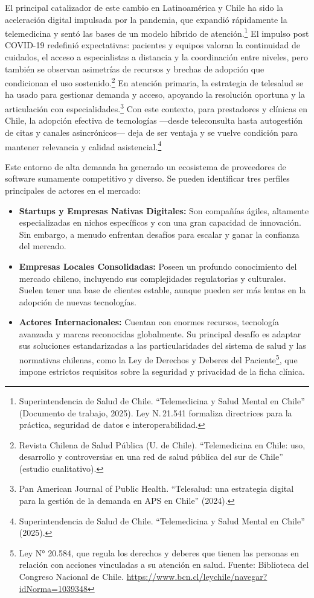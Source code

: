 El principal catalizador de este cambio en Latinoamérica y Chile ha sido la aceleración digital impulsada por la pandemia, que expandió rápidamente la telemedicina y sentó las bases de un modelo híbrido de atención.\footnote{Superintendencia de Salud de Chile. ``Telemedicina y Salud Mental en Chile'' (Documento de trabajo, 2025). Ley N.\,21.541 formaliza directrices para la práctica, seguridad de datos e interoperabilidad.} El impulso post COVID-19 redefinió expectativas: pacientes y equipos valoran la continuidad de cuidados, el acceso a especialistas a distancia y la coordinación entre niveles, pero también se observan asimetrías de recursos y brechas de adopción que condicionan el uso sostenido.\footnote{Revista Chilena de Salud Pública (U. de Chile). ``Telemedicina en Chile: uso, desarrollo y controversias en una red de salud pública del sur de Chile'' (estudio cualitativo).} En atención primaria, la estrategia de telesalud se ha usado para gestionar demanda y acceso, apoyando la resolución oportuna y la articulación con especialidades.\footnote{Pan American Journal of Public Health. ``Telesalud: una estrategia digital para la gestión de la demanda en APS en Chile'' (2024).} Con este contexto, para prestadores y clínicas en Chile, la adopción efectiva de tecnologías —desde teleconsulta hasta autogestión de citas y canales asincrónicos— deja de ser ventaja y se vuelve condición para mantener relevancia y calidad asistencial.\footnote{Superintendencia de Salud de Chile. ``Telemedicina y Salud Mental en Chile'' (2025).}


Este entorno de alta demanda ha generado un ecosistema de proveedores de software sumamente competitivo y diverso. Se pueden identificar tres perfiles principales de actores en el mercado:

\begin{itemize}
    \item \textbf{Startups y Empresas Nativas Digitales:} Son compañías ágiles, altamente especializadas en nichos específicos y con una gran capacidad de innovación. Sin embargo, a menudo enfrentan desafíos para escalar y ganar la confianza del mercado.
    
    \item \textbf{Empresas Locales Consolidadas:} Poseen un profundo conocimiento del mercado chileno, incluyendo sus complejidades regulatorias y culturales. Suelen tener una base de clientes estable, aunque pueden ser más lentas en la adopción de nuevas tecnologías.
    
    \item \textbf{Actores Internacionales:} Cuentan con enormes recursos, tecnología avanzada y marcas reconocidas globalmente. Su principal desafío es adaptar sus soluciones estandarizadas a las particularidades del sistema de salud y las normativas chilenas, como la Ley de Derechos y Deberes del Paciente\footnote{Ley N° 20.584, que regula los derechos y deberes que tienen las personas en relación con acciones vinculadas a su atención en salud. Fuente: Biblioteca del Congreso Nacional de Chile. \url{https://www.bcn.cl/leychile/navegar?idNorma=1039348}}, que impone estrictos requisitos sobre la seguridad y privacidad de la ficha clínica.
\end{itemize}

